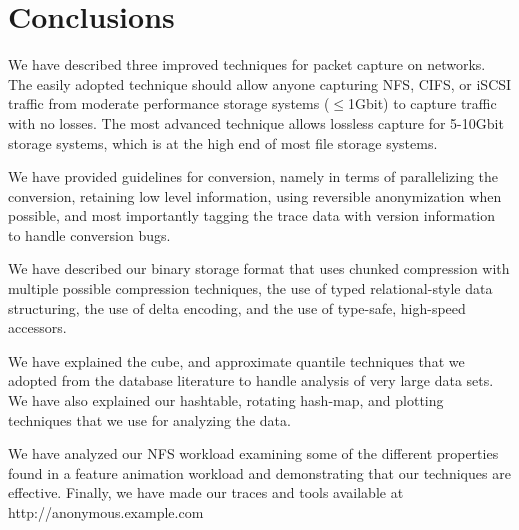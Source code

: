 \section{Conclusions}
\label{sec:conclusion}

We have described three improved techniques for packet capture on
networks.  The easily adopted technique should allow anyone capturing
NFS, CIFS, or iSCSI traffic from moderate performance storage systems
($\leq$1Gbit) to capture traffic with no losses.  The most advanced
technique allows lossless capture for 5-10Gbit storage systems, which
is at the high end of most file storage systems. 

We have provided guidelines for conversion, namely in terms of
parallelizing the conversion, retaining low level information, using
reversible anonymization when possible, and most importantly tagging
the trace data with version information to handle conversion bugs.

We have described our binary storage format that uses chunked
compression with multiple possible compression techniques, the use of
typed relational-style data structuring, the use of delta encoding,
and the use of type-safe, high-speed accessors.

We have explained the cube, and approximate quantile techniques that
we adopted from the database literature to handle analysis of very
large data sets.  We have also explained our hashtable, rotating
hash-map, and plotting techniques that we use for analyzing the data.

We have analyzed our NFS workload examining some of the different
properties found in a feature animation workload and demonstrating
that our techniques are effective.  Finally, we have made our traces
and tools available at http://anonymous.example.com



